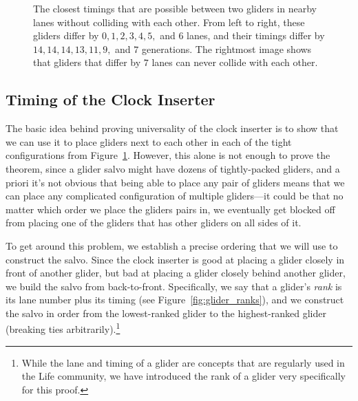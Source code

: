 \begin{figure}[!htb]
	\centering
	\caption{The closest timings that are possible between two gliders in nearby lanes without colliding with each other. From left to right, these gliders differ by $0, 1, 2, 3, 4, 5,$ and $6$ lanes, and their timings differ by $14, 14, 14, 13, 11, 9,$ and $7$ generations. The rightmost image shows that gliders that differ by $7$ lanes can never collide with each other.}\label{fig:tight_glider_packings}
\end{figure}


\subsection{Timing of the Clock Inserter}\label{sec:clock_inserter_timing}

The basic idea behind proving universality of the clock inserter is to show that we can use it to place gliders next to each other in each of the tight configurations from Figure~\ref{fig:tight_glider_packings}. However, this alone is not enough to prove the theorem, since a glider salvo might have dozens of tightly-packed gliders, and a priori it's not obvious that being able to place any pair of gliders means that we can place any complicated configuration of multiple gliders---it could be that no matter which order we place the gliders pairs in, we eventually get blocked off from placing one of the gliders that has other gliders on all sides of it.

To get around this problem, we establish a precise ordering that we will use to construct the salvo. Since the clock inserter is good at placing a glider closely in front of another glider, but bad at placing a glider closely behind another glider, we build the salvo from back-to-front. Specifically, we say that a glider's \emph{rank} is its lane number plus its timing (see Figure~\ref{fig:glider_ranks}), and we construct the salvo in order from the lowest-ranked glider to the highest-ranked glider (breaking ties arbitrarily).\footnote{While the lane and timing of a glider are concepts that are regularly used in the Life community, we have introduced the rank of a glider very specifically for this proof.}


